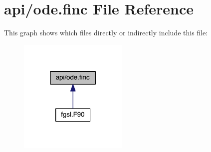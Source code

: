 \hypertarget{ode_8finc}{\section{api/ode.finc File Reference}
\label{ode_8finc}
}
This graph shows which files directly or indirectly include this file\-:
\nopagebreak
\begin{figure}[H]
\begin{center}
\leavevmode
\includegraphics[width=148pt]{ode_8finc__dep__incl}
\end{center}
\end{figure}
